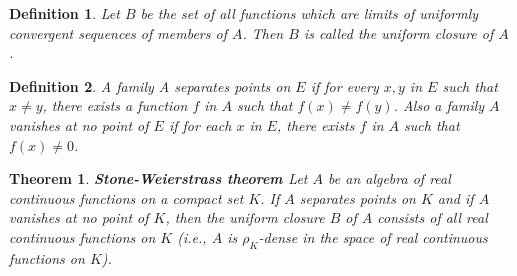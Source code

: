 \documentclass[12pt]{amsart}
\newtheorem{definition}{Definition}
\theoremstyle{plain}
\newtheorem{thm}{Theorem}[section]
\theoremstyle{definition}
\theoremstyle{remark}
\numberwithin{equation}{section}
\numberwithin{thm}{section}
\begin{document}
\begin{definition} %
    Let $B$ be the set of all functions which are limits of uniformly convergent sequences of members of $A$. Then $B$ is called the uniform closure of $A$.
\end{definition}
\begin{definition}
    A family A separates points on $E$ if for every $x,y$ in $E$ such that $x\neq y$, there exists a function $f$ in $A$ such that $f(x)\neq f(y)$. Also a family $A$ vanishes at no point of $E$ if for each $x$ in $E$, there exists $f$ in $A$ such that $f(x)\neq 0$.
\end{definition}

\begin{thm} \label{thm:stonew}
\textbf{Stone-Weierstrass theorem \cite{RudinMathAnalysis} } \label{thm:StoneW}
Let $A$ be an algebra of real continuous functions on a compact set $K$. If $A$ separates points on $K$ and if $A$ vanishes at no point of $K$, then the uniform closure $B$ of $A$ consists of all real continuous functions on $K$ (i.e., $A$ is $\rho_K$-dense in the space of real continuous functions on $K$).
\end{thm}
\end{document}
